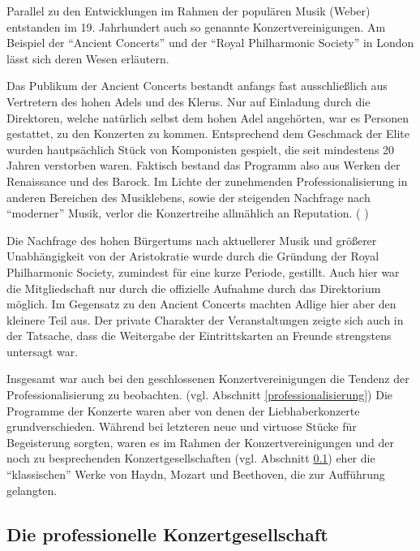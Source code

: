 \documentclass[a4paper, german, oneside]{scrbook}
\begin{document}
Parallel zu den Entwicklungen im Rahmen der populären Musik (Weber) entstanden im 19. Jahrhundert auch so genannte Konzertvereinigungen. Am Beispiel der \enquote{Ancient Concerts} und der \enquote{Royal Philharmonic Society} in London lässt sich deren Wesen erläutern.

Das Publikum der Ancient Concerts bestandt anfangs fast ausschließlich aus Vertretern des hohen Adels und des Klerus. Nur auf Einladung durch die Direktoren, welche natürlich selbst dem hohen Adel angehörten, war es Personen gestattet, zu den Konzerten zu kommen. Entsprechend dem Geschmack der Elite wurden hautpsächlich Stück von Komponisten gespielt, die seit mindestens 20 Jahren verstorben waren. Faktisch bestand das Programm also aus Werken der Renaissance und des Barock. Im Lichte der zunehmenden Professionalisierung in anderen Bereichen des Musiklebens, sowie der steigenden Nachfrage nach \enquote{moderner} Musik, verlor die Konzertreihe allmählich an Reputation. (\cite[92ff.;]{muller_publikum_2014} \cite[73]{weber_music_2004})

Die Nachfrage des hohen Bürgertums nach aktuellerer Musik und größerer Unabhängigkeit von der Aristokratie wurde durch die Gründung der Royal Philharmonic Society, zumindest für eine kurze Periode, gestillt. Auch hier war die Mitgliedschaft nur durch die offizielle Aufnahme durch das Direktorium möglich. Im Gegensatz zu den Ancient Concerts machten Adlige hier aber den kleinere Teil aus. Der private Charakter der Veranstaltungen zeigte sich auch in der Tatsache, dass die Weitergabe der Eintrittskarten an Freunde strengstens untersagt war. \parencite[93]{muller_publikum_2014}

Insgesamt war auch bei den geschlossenen Konzertvereinigungen die Tendenz der Professionalisierung zu beobachten. (vgl. Abschnitt \ref{professionalisierung}) Die Programme der Konzerte waren aber von denen der Liebhaberkonzerte grundverschieden. Während bei letzteren neue und virtuose Stücke für Begeisterung sorgten, waren es im Rahmen der Konzertvereinigungen und der noch zu besprechenden Konzertgesellschaften (vgl. Abschnitt \ref{konzertgesellschaft}) eher die \enquote{klassischen} Werke von Haydn, Mozart und Beethoven, die zur Aufführung gelangten. \parencite[22f]{weber_music_2004}


\subsection{Die professionelle Konzertgesellschaft}
\label{konzertgesellschaft}
\end{document}
